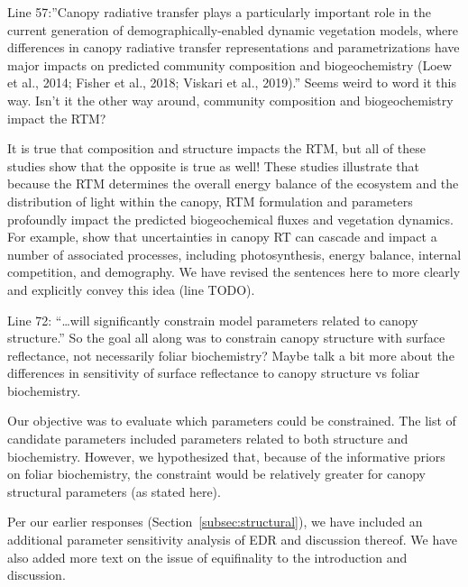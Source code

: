 \begin{reviewer}
Line 57:”Canopy radiative transfer plays a particularly important role in the current generation of demographically-enabled dynamic vegetation models, where differences in canopy radiative transfer representations and parametrizations have major impacts on predicted community composition and biogeochemistry (Loew et al., 2014; Fisher et al., 2018; Viskari et al., 2019).” Seems weird to word it this way. Isn’t it the other way around, community composition and biogeochemistry impact the RTM?
\end{reviewer}

It is true that composition and structure impacts the RTM, but all of these studies show that the opposite is true as well!
These studies illustrate  that because the RTM determines the overall energy balance of the ecosystem and the distribution of light within the canopy, RTM formulation and parameters profoundly impact the predicted biogeochemical fluxes and vegetation dynamics.
For example, \citet{viskari_2019_influence} show that uncertainties in canopy RT can cascade and impact a number of associated processes, including photosynthesis, energy balance, internal competition, and demography.
We have revised the sentences here to more clearly and explicitly convey this idea (line TODO).


\begin{reviewer}
  Line 72: “\ldots will significantly constrain model parameters related to canopy structure.” So the goal all along was to constrain canopy structure with surface reflectance, not necessarily foliar biochemistry? Maybe talk a bit more about the differences in sensitivity of surface reflectance to canopy structure vs foliar biochemistry.
\end{reviewer}

Our objective was to evaluate which parameters could be constrained.
The list of candidate parameters included parameters related to both structure and biochemistry.
However, we hypothesized that, because of the informative priors on foliar biochemistry, the constraint would be relatively greater for canopy structural parameters (as stated here).

Per our earlier responses (Section~\ref{subsec:structural}), we have included an additional parameter sensitivity analysis of EDR and discussion thereof.
We have also added more text on the issue of equifinality to the introduction and discussion.


